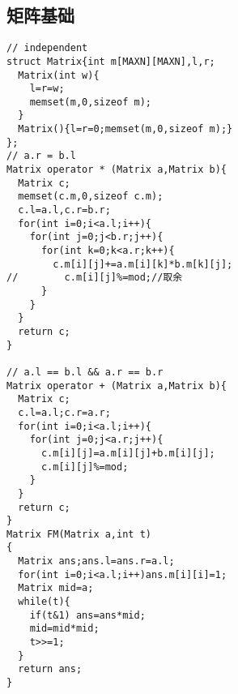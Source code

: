 \subsection{矩阵基础}
\begin{lstlisting}[language={}]
// independent 
struct Matrix{int m[MAXN][MAXN],l,r;
  Matrix(int w){
    l=r=w;  
    memset(m,0,sizeof m);
  }
  Matrix(){l=r=0;memset(m,0,sizeof m);}
};
// a.r = b.l
Matrix operator * (Matrix a,Matrix b){ 
  Matrix c;
  memset(c.m,0,sizeof c.m);
  c.l=a.l,c.r=b.r;
  for(int i=0;i<a.l;i++){
    for(int j=0;j<b.r;j++){
      for(int k=0;k<a.r;k++){
        c.m[i][j]+=a.m[i][k]*b.m[k][j];
//        c.m[i][j]%=mod;//取余 
      }
    } 
  } 
  return c;
} 

// a.l == b.l && a.r == b.r
Matrix operator + (Matrix a,Matrix b){
  Matrix c;
  c.l=a.l;c.r=a.r;
  for(int i=0;i<a.l;i++){
    for(int j=0;j<a.r;j++){
      c.m[i][j]=a.m[i][j]+b.m[i][j];
      c.m[i][j]%=mod;
    } 
  }
  return c;
}
Matrix FM(Matrix a,int t)
{
  Matrix ans;ans.l=ans.r=a.l;
  for(int i=0;i<a.l;i++)ans.m[i][i]=1;
  Matrix mid=a;
  while(t){
    if(t&1) ans=ans*mid;
    mid=mid*mid;
    t>>=1;
  }
  return ans;
}
\end{lstlisting}
